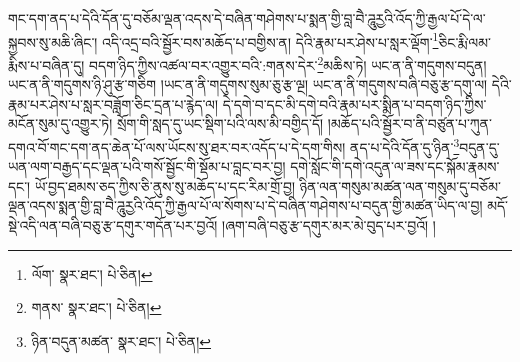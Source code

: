 གང་དག་ནད་པ་དེའི་དོན་དུ་བཅོམ་ལྡན་འདས་དེ་བཞིན་གཤེགས་པ་སྨན་གྱི་བླ་བཻ་ཌཱུརྱའི་འོད་ཀྱི་རྒྱལ་པོ་དེ་ལ་སྐྱབས་སུ་མཆི་ཞིང་། འདི་འདྲ་བའི་སྦྱོར་བས་མཆོད་པ་བགྱིས་ན། དེའི་རྣམ་པར་ཤེས་པ་སླར་ལྡོག་\footnote{ལོག་  སྣར་ཐང་།  པེ་ཅིན། }ཅིང་རྨི་ལམ་རྨིས་པ་བཞིན་དུ། བདག་ཉིད་ཀྱིས་འཚལ་བར་འགྱུར་བའི་:གནས་དེར་\footnote{གནས་  སྣར་ཐང་།  པེ་ཅིན། }མཆིས་ཏེ། ཡང་ན་ནི་གདུགས་བདུན། ཡང་ན་ནི་གདུགས་ཉི་ཤུ་རྩ་གཅིག །ཡང་ན་ནི་གདུགས་སུམ་ཅུ་རྩ་ལྔ། ཡང་ན་ནི་གདུགས་བཞི་བཅུ་རྩ་དགུ་ལ། དེའི་རྣམ་པར་ཤེས་པ་སླར་བཟློག་ཅིང་དྲན་པ་རྙེད་ལ། དེ་དགེ་བ་དང་མི་དགེ་བའི་རྣམ་པར་སྨིན་པ་བདག་ཉིད་ཀྱིས་མངོན་སུམ་དུ་འགྱུར་ཏེ། སྲོག་གི་སླད་དུ་ཡང་སྡིག་པའི་ལས་མི་བགྱིད་དོ། །མཆོད་པའི་སྦྱོར་བ་ནི་བཙུན་པ་ཀུན་དགའ་བོ་གང་དག་ནད་ཆེན་པོ་ལས་ཡོངས་སུ་ཐར་བར་འདོད་པ་དེ་དག་གིས། ནད་པ་དེའི་དོན་དུ་ཉིན་\footnote{ཉིན་བདུན་མཚན་  སྣར་ཐང་།  པེ་ཅིན། }བདུན་དུ་ཡན་ལག་བརྒྱད་དང་ལྡན་པའི་གསོ་སྦྱོང་གི་སྡོམ་པ་བླང་བར་བྱ། དགེ་སློང་གི་དགེ་འདུན་ལ་ཟས་དང་སྐོམ་རྣམས་དང་། ཡོ་བྱད་ཐམས་ཅད་ཀྱིས་ཅི་ནུས་སུ་མཆོད་པ་དང་རིམ་གྲོ་བྱ། ཉིན་ལན་གསུམ་མཚན་ལན་གསུམ་དུ་བཅོམ་ལྡན་འདས་སྨན་གྱི་བླ་བཻ་ཌཱུརྱའི་འོད་ཀྱི་རྒྱལ་པོ་ལ་སོགས་པ་དེ་བཞིན་གཤེགས་པ་བདུན་གྱི་མཚན་ཡིད་ལ་བྱ། མདོ་སྡེ་འདི་ལན་བཞི་བཅུ་རྩ་དགུར་གདོན་པར་བྱའོ། །ཞག་བཞི་བཅུ་རྩ་དགུར་མར་མེ་བུད་པར་བྱའོ། །
